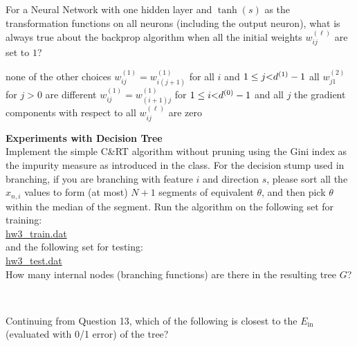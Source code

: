 \documentclass[a4paper,10pt]{exam}
\begin{document}
\begin{questions}
	    \question For a Neural Network with one hidden layer and $\tanh(s)$ as the transformation functions on all neurons (including the output neuron), what is always true about the backprop algorithm when all the initial weights $w_{ij}^{(\ell)}$ are set to $1$?
	    \begin{choices}
	    	\choice none of the other choices
	    	\CorrectChoice $w_{ij}^{(1)} = w_{i(j+1)}^{(1)}$ for all $i$ and $1 \le j{\rm{  < }}{d^{(1)}} - 1$
	    	\choice all $w_{j1}^{(2)}$ for $j>0$ are different
	    	\choice $w_{ij}^{(1)} = w_{(i+1)j}^{(1)}$ for $1 \le i{\rm{  < }}{d^{(0)}} - 1$ and all $j$
	    	\choice the gradient components with respect to all $w_{ij}^{(\ell)}$ are zero\\
	    \end{choices}
	    
	    \question \textbf{Experiments with Decision Tree}\\
	    Implement the simple C\&RT algorithm without pruning using the Gini index as the impurity measure as introduced in the class. For the decision stump used in branching, if you are branching with feature $i$ and direction $s$, please sort all the $x_{n, i}$ values to form (at most) $N+1$ segments of equivalent $\theta$, and then pick $\theta$ within the median of the segment. Run the algorithm on the following set for training:\\
	    \href{https://d396qusza40orc.cloudfront.net/ntumltwo/hw3_data/hw3_train.dat}{hw3\_train.dat}\\
	    and the following set for testing:\\
	    \href{https://d396qusza40orc.cloudfront.net/ntumltwo/hw3_data/hw3_test.dat}{hw3\_test.dat}\\
	    How many internal nodes (branching functions) are there in the resulting tree $G$?
	    \begin{choices}
	    	\choice 12
	    	\choice 8
	    	\choice 14
	    	\CorrectChoice 10
	    	\choice 6\\
	    \end{choices}
	    
	    \question Continuing from Question 13, which of the following is closest to the $E_{\text{in}}$ (evaluated with 0/1 error) of the tree?
	    \begin{choices}
	    	\CorrectChoice 0.0
	    	\choice 0.1
	    	\choice 0.2
	    	\choice 0.3
	    	\choice 0.4\\
	    \end{choices}
	    

\end{questions}
\end{document}
